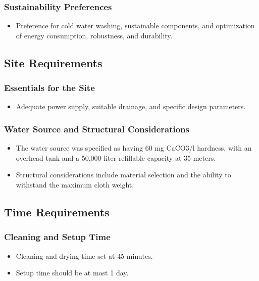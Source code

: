 \documentclass[table,french,english]{rapportCS}
\begin{document}
  \subsubsection{Sustainability Preferences}\label{sec:suspref}
    \begin{itemize}[label=$\bullet$]
      \item Preference for cold water washing,  \gls{sustainable} components, and optimization of energy consumption, robustness, and durability.
    \end{itemize}

\subsection{Site Requirements}\label{sec:sitereq}
\subsubsection{Essentials for the Site}\label{sec:essenforsite}
    \begin{itemize}[label=$\bullet$]
      \item Adequate power supply, suitable drainage, and specific design parameters.
    \end{itemize}
  
 \subsubsection{Water Source and Structural Considerations}\label{sec:watersource}
    \begin{itemize}[label=$\bullet$]
      \item The water source was specified as having 60 mg CaCO3/l hardness, with an overhead tank and a 50,000-liter refillable capacity at 35 meters.
      \item Structural considerations include material selection and the ability to withstand the maximum cloth weight.
    \end{itemize}

\subsection{Time Requirements}\label{sec:timereq}
\subsubsection{Cleaning and Setup Time}\label{sec: cnstimes}
    \begin{itemize}[label=$\bullet$]
      \item Cleaning and drying time set at 45 minutes.
      \item Setup time should be at most 1 day.
    \end{itemize}
\end{document}
